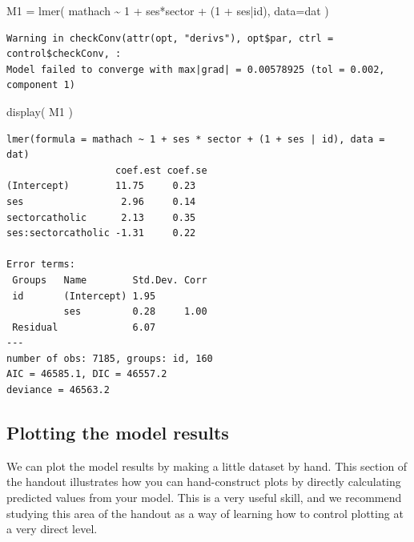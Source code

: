 \documentclass[
  letterpaper,
  DIV=11,
  numbers=noendperiod]{scrreprt}
\newenvironment{Shaded}{\begin{snugshade}}{\end{snugshade}}
\newcommand{\AttributeTok}[1]{\textcolor[rgb]{0.49,0.56,0.16}{#1}}
\newcommand{\DecValTok}[1]{\textcolor[rgb]{0.25,0.63,0.44}{#1}}
\newcommand{\FunctionTok}[1]{\textcolor[rgb]{0.02,0.16,0.49}{#1}}
\newcommand{\NormalTok}[1]{\textcolor[rgb]{0.00,0.44,0.13}{#1}}
\newcommand{\OtherTok}[1]{\textcolor[rgb]{0.00,0.44,0.13}{#1}}
\newcommand{\SpecialCharTok}[1]{\textcolor[rgb]{0.25,0.44,0.63}{#1}}
\begin{document}
\begin{Shaded}
\begin{Highlighting}[]
\NormalTok{M1 }\OtherTok{=} \FunctionTok{lmer}\NormalTok{( mathach }\SpecialCharTok{\textasciitilde{}} \DecValTok{1} \SpecialCharTok{+}\NormalTok{ ses}\SpecialCharTok{*}\NormalTok{sector }\SpecialCharTok{+}\NormalTok{ (}\DecValTok{1} \SpecialCharTok{+}\NormalTok{ ses}\SpecialCharTok{|}\NormalTok{id), }\AttributeTok{data=}\NormalTok{dat )}
\end{Highlighting}
\end{Shaded}

\begin{verbatim}
Warning in checkConv(attr(opt, "derivs"), opt$par, ctrl = control$checkConv, :
Model failed to converge with max|grad| = 0.00578925 (tol = 0.002, component 1)
\end{verbatim}

\begin{Shaded}
\begin{Highlighting}[]
\FunctionTok{display}\NormalTok{( M1 )}
\end{Highlighting}
\end{Shaded}

\begin{verbatim}
lmer(formula = mathach ~ 1 + ses * sector + (1 + ses | id), data = dat)
                   coef.est coef.se
(Intercept)        11.75     0.23  
ses                 2.96     0.14  
sectorcatholic      2.13     0.35  
ses:sectorcatholic -1.31     0.22  

Error terms:
 Groups   Name        Std.Dev. Corr 
 id       (Intercept) 1.95          
          ses         0.28     1.00 
 Residual             6.07          
---
number of obs: 7185, groups: id, 160
AIC = 46585.1, DIC = 46557.2
deviance = 46563.2 
\end{verbatim}

\hypertarget{plotting-the-model-results}{%
\subsection{Plotting the model
results}\label{plotting-the-model-results}}

We can plot the model results by making a little dataset by hand. This
section of the handout illustrates how you can hand-construct plots by
directly calculating predicted values from your model. This is a very
useful skill, and we recommend studying this area of the handout as a
way of learning how to control plotting at a very direct level.
\end{document}
